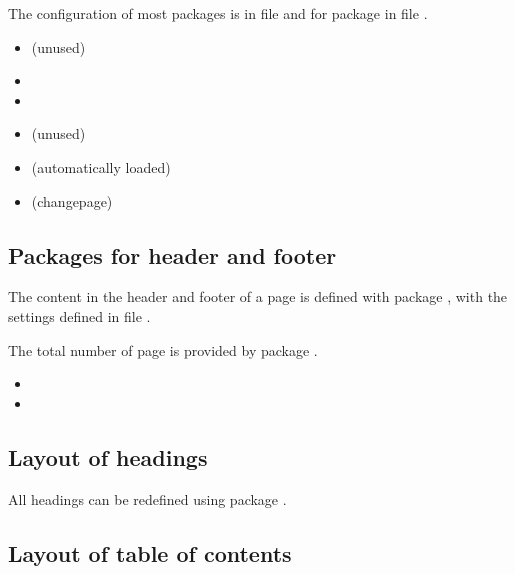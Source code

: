 The configuration of most packages is in file  and for package  in file .


\begin{itemize}[noitemsep]
\item {} (unused)
\item {}
\item {}
\item {} (unused)
\item {} (automatically loaded)
\item {} (changepage)
\end{itemize}


\subsection{Packages for header and footer}

The content in the header and footer of a page is defined with package , with the settings defined in file .

The total number of page is provided by package .

\begin{itemize}[noitemsep]
\item {}
\item {}
\end{itemize}


\subsection{Layout of headings}

All headings can be redefined using package .


\subsection{Layout of table of contents}

